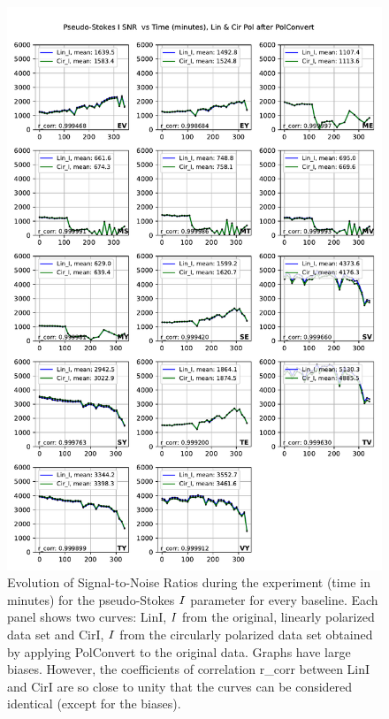 \documentclass[letterpaper,twoside,12pt]{article}
\begin{document}
\begin{figure}[ht!]
  \begin{center}
  \includegraphics[width=33pc]{SNR_Lin_I_and_Cir_I.pdf}
  \caption{\small Evolution of Signal-to-Noise Ratios during the experiment (time in minutes) for the pseudo-Stokes $\protect I$ parameter for every baseline. Each panel shows two curves: LinI, $\protect I$ from the original, linearly polarized data set and CirI, $\protect I$ from the circularly polarized data set obtained by applying PolConvert to the original data. Graphs have large biases. However, the coefficients of correlation r\_corr between LinI and CirI are so close to unity that the curves can be considered identical (except for the biases).}
  \label{snr_lin_and_cir}
  \end{center}
\end{figure}
\end{document}
